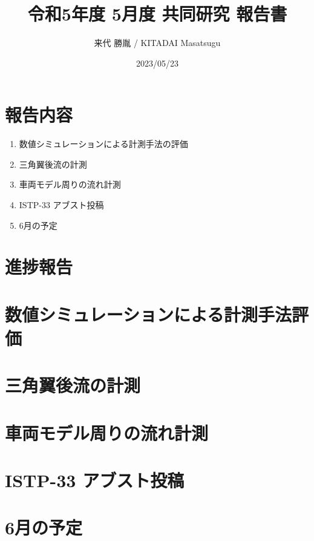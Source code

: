 \documentclass[twocolumn,a4j]{jsarticle}
\author{来代 勝胤 / KITADAI Masatsugu}
\title{令和5年度 5月度 共同研究 報告書}
\date{2023/05/23}
\begin{document}
\columnseprule=0.1mm
\maketitle

\section*{報告内容}
\begin{enumerate}[1.]
  \item 数値シミュレーションによる計測手法の評価
  \item 三角翼後流の計測
  \item 車両モデル周りの流れ計測
  \item ISTP-33 アブスト投稿
  \item 6月の予定
\end{enumerate}

\section*{進捗報告}

\section{数値シミュレーションによる計測手法評価}

\section{三角翼後流の計測}

\section{車両モデル周りの流れ計測}

\section{ISTP-33 アブスト投稿}

\section{6月の予定}
\end{document}

